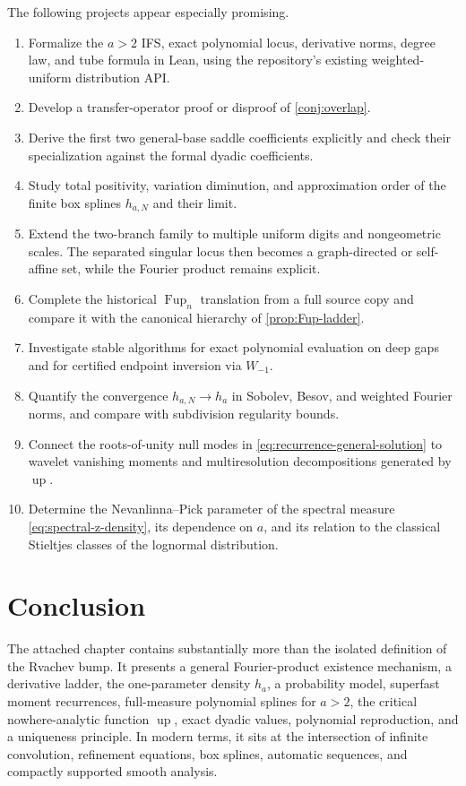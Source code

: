 \documentclass[11pt,oneside]{article}
\theoremstyle{definition}
\theoremstyle{remark}
\newcommand{\Up}{\operatorname{up}}
\begin{document}
The following projects appear especially promising.

\begin{enumerate}
\item Formalize the $a>2$ IFS, exact polynomial locus, derivative norms, degree law, and tube
      formula in Lean, using the repository's existing weighted-uniform distribution API.
\item Develop a transfer-operator proof or disproof of \cref{conj:overlap}.
\item Derive the first two general-base saddle coefficients explicitly and check their
      specialization against the formal dyadic coefficients.
\item Study total positivity, variation diminution, and approximation order of the finite
      box splines $h_{a,N}$ and their limit.
\item Extend the two-branch family to multiple uniform digits and nongeometric scales.  The
      separated singular locus then becomes a graph-directed or self-affine set, while the
      Fourier product remains explicit.
\item Complete the historical $\operatorname{Fup}_n$ translation from a full source copy and
      compare it with the canonical hierarchy of \cref{prop:Fup-ladder}.
\item Investigate stable algorithms for exact polynomial evaluation on deep gaps and for
      certified endpoint inversion via $W_{-1}$.
\item Quantify the convergence $h_{a,N}\to h_a$ in Sobolev, Besov, and weighted Fourier norms,
      and compare with subdivision regularity bounds.
\item Connect the roots-of-unity null modes in \eqref{eq:recurrence-general-solution} to
      wavelet vanishing moments and multiresolution decompositions generated by $\Up$.
\item Determine the Nevanlinna--Pick parameter of the spectral measure
      \eqref{eq:spectral-z-density}, its dependence on $a$, and its relation to the classical
      Stieltjes classes of the lognormal distribution.
\end{enumerate}

\section{Conclusion}

The attached chapter contains substantially more than the isolated definition of the
Rvachev bump.  It presents a general Fourier-product existence mechanism, a derivative
ladder, the one-parameter density $h_a$, a probability model, superfast moment recurrences,
full-measure polynomial splines for $a>2$, the critical nowhere-analytic function $\Up$,
exact dyadic values, polynomial reproduction, and a uniqueness principle.  In modern terms,
it sits at the intersection of infinite convolution, refinement equations, box splines,
automatic sequences, and compactly supported smooth analysis.
\end{document}
